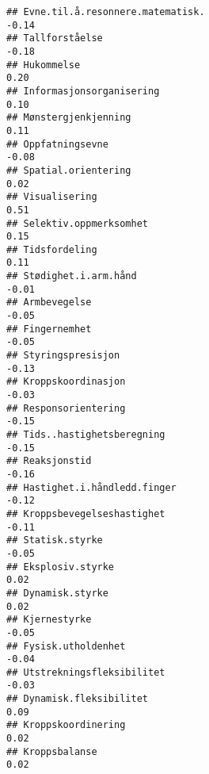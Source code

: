 \documentclass[
]{article}
\begin{document}
\begin{verbatim}
## Evne.til.å.resonnere.matematisk.                                                 -0.14
## Tallforståelse                                                                   -0.18
## Hukommelse                                                                        0.20
## Informasjonsorganisering                                                          0.10
## Mønstergjenkjenning                                                               0.11
## Oppfatningsevne                                                                  -0.08
## Spatial.orientering                                                               0.02
## Visualisering                                                                     0.51
## Selektiv.oppmerksomhet                                                            0.15
## Tidsfordeling                                                                     0.11
## Stødighet.i.arm.hånd                                                             -0.01
## Armbevegelse                                                                     -0.05
## Fingernemhet                                                                     -0.05
## Styringspresisjon                                                                -0.13
## Kroppskoordinasjon                                                               -0.03
## Responsorientering                                                               -0.15
## Tids..hastighetsberegning                                                        -0.15
## Reaksjonstid                                                                     -0.16
## Hastighet.i.håndledd.finger                                                      -0.12
## Kroppsbevegelseshastighet                                                        -0.11
## Statisk.styrke                                                                   -0.05
## Eksplosiv.styrke                                                                  0.02
## Dynamisk.styrke                                                                   0.02
## Kjernestyrke                                                                     -0.05
## Fysisk.utholdenhet                                                               -0.04
## Utstrekningsfleksibilitet                                                        -0.03
## Dynamisk.fleksibilitet                                                            0.09
## Kroppskoordinering                                                                0.02
## Kroppsbalanse                                                                     0.02

\end{verbatim}
\end{document}
